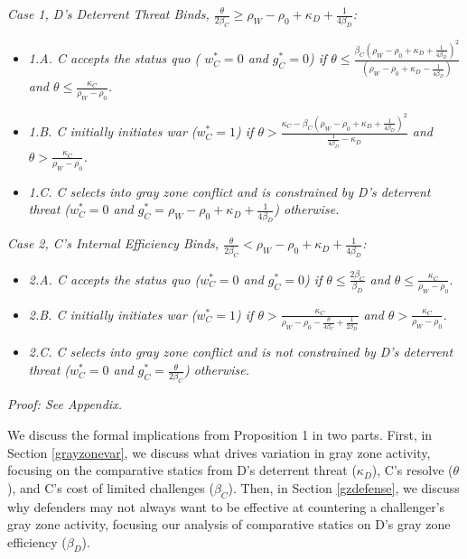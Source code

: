 \documentclass[11pt,letterpaper,pdftex,dvipsnames,table]{article}
\begin{document}
    \textit{Case 1, D's Deterrent Threat Binds, $\frac{\theta}{2\beta_{C}}\geq\rho_{W}-\rho_{0}+\kappa_{D}+\frac{1}{4\beta_{D}}$:} 
    \begin{itemize}
    \item \textit{1.A. C accepts the status quo ( $w_{C}^{*}=0$ and $g_{C}^{*}=0$)
    if $\theta\leq\frac{\beta_{C}\left(\rho_{W}-\rho_{0}+\kappa_{D}+\frac{1}{4\beta_{D}}\right)^{2}}{\left(\rho_{W}-\rho_{0}+\kappa_{D}-\frac{1}{4\beta_{D}}\right)}$
    and $\theta\leq\frac{\kappa_{C}}{\rho_{W}-\rho_{0}}$.} 
    \item \textit{1.B. C initially initiates war ($w_{C}^{*}=1$) if $\theta>\frac{\kappa_{C}-\beta_{C}\left(\rho_{W}-\rho_{0}+\kappa_{D}+\frac{1}{4\beta_{D}}\right)^{2}}{\frac{1}{4\beta_{D}}-\kappa_{D}}$
    and $\theta>\frac{\kappa_{C}}{\rho_{W}-\rho_{0}}$.} 
    \item \textit{1.C. C selects into gray zone conflict and is constrained
    by D's deterrent threat ($w_{C}^{*}=0$ and $g_{C}^{*}=\rho_{W}-\rho_{0}+\kappa_{D}+\frac{1}{4\beta_{D}}$)
    otherwise.} 
    \end{itemize}
    \textit{Case 2, C's Internal Efficiency Binds, $\frac{\theta}{2\beta_{C}}<\rho_{W}-\rho_{0}+\kappa_{D}+\frac{1}{4\beta_{D}}$:} 
    \begin{itemize}
    \item \textit{2.A. C accepts the status quo ($w_{C}^{*}=0$ and $g_{C}^{*}=0$)
    if $\theta\leq\frac{2\beta_{C}}{\beta_{D}}$ and $\theta\leq\frac{\kappa_{C}}{\rho_{W}-\rho_{0}}$}. 
    \item \textit{2.B. C initially initiates war ($w_{C}^{*}=1$) if $\theta>\frac{\kappa_{C}}{\rho_{W}-\rho_{0}-\frac{\theta}{4\beta_{C}}+\frac{1}{2\beta_{D}}}$
    and $\theta>\frac{\kappa_{C}}{\rho_{W}-\rho_{0}}$.} 
    \item \textit{2.C. C selects into gray zone conflict and is not constrained
    by D's deterrent threat ($w_{C}^{*}=0$ and $g_{C}^{*}=\frac{\theta}{2\beta_{C}}$)
    otherwise.} 
    \end{itemize}
    \textit{Proof: See Appendix.}
    
We discuss the formal implications from Proposition 1 in two parts. First, in Section \ref{grayzonevar}, we discuss what drives variation in gray zone activity, focusing on the comparative statics from D's deterrent threat ($\kappa_D$), C's resolve ($\theta$), and C's cost of limited challenges ($\beta_C$). Then, in Section \ref{gzdefense}, we discuss why defenders may not always want to be effective at countering a challenger's gray zone activity, focusing our analysis of comparative statics on D's gray zone efficiency ($\beta_D$).
\end{document}
